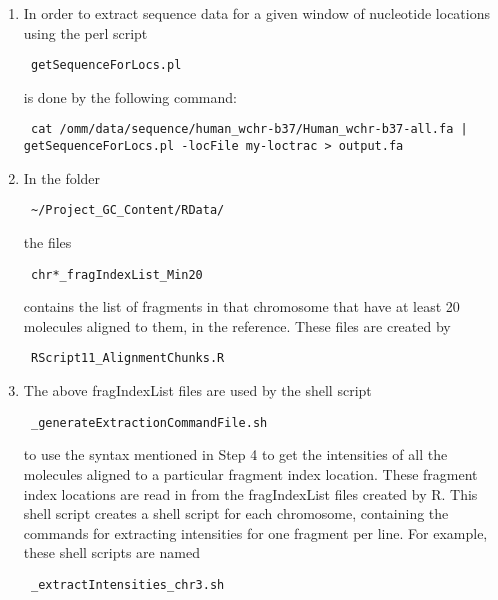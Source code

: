 \documentclass[11pt]{article}
\begin{document}
\begin{enumerate}
\item
In order to extract sequence data for a given window of nucleotide locations using the perl script \begin{verbatim} getSequenceForLocs.pl \end{verbatim} 
is done by the following command:
\begin{verbatim} cat /omm/data/sequence/human_wchr-b37/Human_wchr-b37-all.fa | 
getSequenceForLocs.pl -locFile my-loctrac > output.fa 
\end{verbatim}

\item
In the folder \begin{verbatim} ~/Project_GC_Content/RData/ \end{verbatim}
the files \begin{verbatim} chr*_fragIndexList_Min20 \end{verbatim} 
contains the list of fragments in that chromosome that have at least 20 molecules aligned to them, in the reference. These files are created by \begin{verbatim} RScript11_AlignmentChunks.R \end{verbatim} 

\item
The above fragIndexList files are used by the shell script \begin{verbatim} _generateExtractionCommandFile.sh \end{verbatim}
to use the syntax mentioned in Step 4 to get the intensities of all the molecules aligned to a particular fragment index location. These fragment index locations are read in from the fragIndexList files created by R. This shell script creates a shell script for each chromosome, containing the commands for extracting intensities for one fragment per line. For example, these shell scripts are named \begin{verbatim} _extractIntensities_chr3.sh \end{verbatim}


\end{enumerate}
\end{document}
